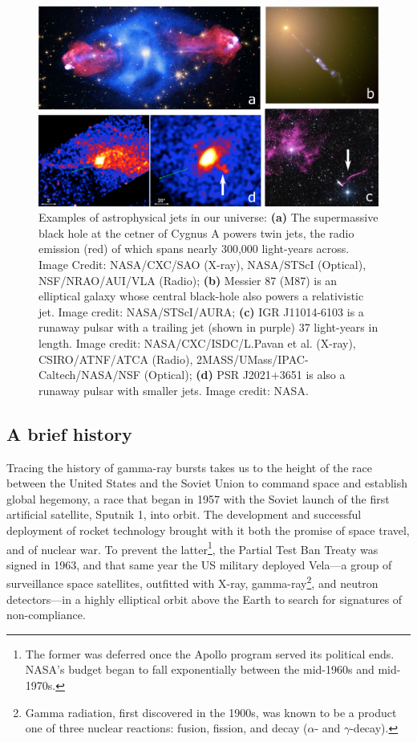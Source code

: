 \documentclass[1.5,11pt]{beavtex}
\begin{document}
\begin{figure}[h!]
  \centering
  \includegraphics[scale=0.50]{images/ch2/jets.png}
  \caption{\selectfont Examples of astrophysical jets in our universe: \textbf{(a)} The supermassive black hole at the cetner of Cygnus A powers twin jets, the radio emission (red) of which spans nearly 300,000 light-years across. Image Credit: NASA/CXC/SAO (X-ray), NASA/STScI (Optical), NSF/NRAO/AUI/VLA (Radio); \textbf{(b)} Messier 87 (M87) is an elliptical galaxy whose central black-hole also powers a relativistic jet. Image credit: NASA/STScI/AURA; \textbf{(c)} IGR J11014-6103 is a runaway pulsar with a trailing jet (shown in purple) 37 light-years in length. Image credit: NASA/CXC/ISDC/L.Pavan et al. (X-ray), CSIRO/ATNF/ATCA (Radio), 2MASS/UMass/IPAC-Caltech/NASA/NSF (Optical); \textbf{(d)} PSR J2021+3651 is also a runaway pulsar with smaller jets. Image credit: NASA.}
  \label{fig:jets}
\end{figure}

\subsection{A brief history}
\label{ch:Astro theory ssec:GRB hx}

Tracing the history of gamma-ray bursts takes us to the height of the race between the United States and the Soviet Union to command space and establish global hegemony, a race that began in 1957 with the Soviet launch of the first artificial satellite, Sputnik 1, into orbit. The development and successful deployment of rocket technology brought with it both the promise of space travel, and of nuclear war. To prevent the latter\footnote{\selectfont The former was deferred once the Apollo program served its political ends. NASA's budget began to fall exponentially between the mid-1960s and mid-1970s.}, the Partial Test Ban Treaty was signed in 1963, and that same year the US military deployed Vela---a group of surveillance space satellites, outfitted with X-ray, gamma-ray\footnote{\selectfont Gamma radiation, first discovered in the 1900s, was known to be a product one of three nuclear reactions: fusion, fission, and decay ($\alpha$- and $\gamma$-decay).}, and neutron detectors---in a highly elliptical orbit above the Earth to search for signatures of non-compliance. 
\end{document}

